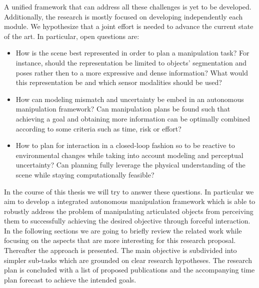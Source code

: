 \medskip 
\newline
A unified framework that can address all these challenges is yet to be developed. Additionally, the research is mostly focused on developing independently each module. We hypothesize that a joint effort is needed to advance the current state of the art. In particular, open questions are:
\begin{itemize}
\item How is the scene best represented in order to plan a manipulation task? For instance, should the representation be limited to objects' segmentation and poses rather then to a more expressive and dense information? What would this representation be and which sensor modalities should be used? 
\item How can modeling mismatch and uncertainty be embed in an autonomous manipulation framework? Can manipulation plans be found such that achieving a goal and obtaining more information can be optimally combined according to some criteria such as time, risk or effort?
\item How to plan for interaction in a closed-loop fashion so to be reactive to environmental changes while taking into account modeling and perceptual uncertainty? Can planning fully leverage the physical understanding of the scene while staying computationally feasible?
\end{itemize}

In the course of this thesis we will try to answer these questions. In particular we aim to develop a integrated autonomous manipulation framework which is able to robustly address the problem of manipulating articulated objects from perceiving them to successfully achieving the desired objective through forceful interaction. In the following sections we are going to briefly review the related work while focusing on the aspects that are more interesting for this research proposal. Thereafter the approach is presented. The main objective is subdivided into simpler sub-tasks which are grounded on clear research hypotheses. The research plan is concluded with a list of proposed publications and the accompanying time plan forecast to achieve the intended goals. 
